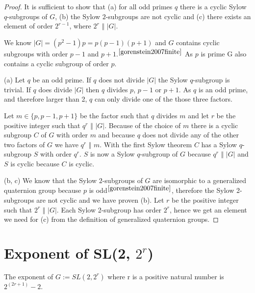 \documentclass[a4paper,10pt]{article}
\begin{document}
\begin{proof}
	It is sufficient to show that (a) for all odd primes $q$ there is a cyclic Sylow $q$-subgroups of $G$, (b) the Sylow $2$-subgroups are not cyclic and (c) there exists an element of order $2^{r-1}$, where $2^r$ $\Vert$ $|G|$.

	We know $|G| = (p^2-1)p = p(p-1)(p+1)$ and $G$ contains cyclic subgroups with order $p-1$ and $p+1$.$^{\cite{gorenstein2007finite}}$ As $p$ is prime G also contains a cyclic subgroup of order $p$.

	(a) Let $q$ be an odd prime. If $q$ does not divide $|G|$ the Sylow $q$-subgroup is trivial. If $q$ does divide $|G|$ then $q$ divides $p$, $p-1$ or $p+1$. As $q$ is an odd prime, and therefore larger than 2, $q$ can only divide one of the those three factors. 

	Let $m \in \{ p, p-1, p+1\}$ be the factor such that $q$ divides $m$ and let $r$ be the positive integer such that $q^r$ $\Vert$ $|G|$. Because of the choice of $m$ there is a cyclic subgroup $C$ of $G$ with order $m$ and because $q$ does not divide any of the other two factors of $G$ we have $q^r$ $\Vert$ $m$. With the first Sylow theorem $C$ has a Sylow $q$-subgroup $S$ with order $q^r$. $S$ is now a Sylow $q$-subgroup of $G$ because $q^r$ $\Vert$ $|G|$ and $S$ is cyclic because $C$ is cyclic. 

	(b, c) We know that the Sylow $2$-subgroups of $G$ are isomorphic to a generalized quaternion group because $p$ is odd$^{\cite{gorenstein2007finite}}$, therefore the Sylow 2-subgroups are not cyclic and we have proven (b). Let $r$ be the positive integer such that $2^r$ $\Vert$ $|G|$. Each Sylow 2-subgroup has order $2^r$, hence we get an element we need for (c) from the definition of generalized quaternion groups.
\end{proof}

\section{Exponent of SL(2, $2^r$)}

\begin{theorem}
	The exponent of $G := SL(2, 2^r)$ where r is a positive natural number is $2^{(2r+1)} - 2$.
\end{theorem}
\end{document}

